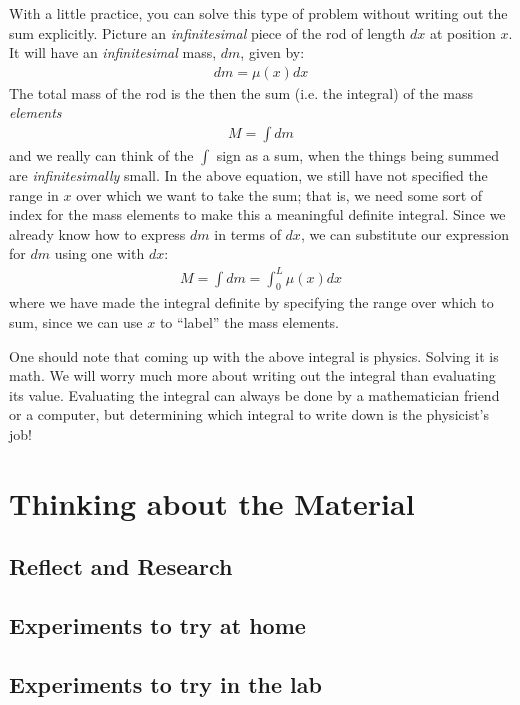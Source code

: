 With a little practice, you can solve this type of problem without writing out the sum explicitly. Picture an \textit{infinitesimal} piece of the rod of length $dx$ at position $x$. It will have an \textit{infinitesimal} mass, $dm$, given by:
\begin{align*}
dm = \mu(x) dx
\end{align*}
The total mass of the rod is the then the sum (i.e. the integral) of the mass \textit{elements}
\begin{align*}
M = \int dm
\end{align*}
and we really can think of the $\int$ sign as a sum, when the things being summed are \textit{infinitesimally} small. In the above equation, we still have not specified the range in $x$ over which we want to take the sum; that is, we need some sort of index for the mass elements to make this a meaningful definite integral. Since we already know how to express $dm$ in terms of $dx$, we can substitute our expression for $dm$ using one with $dx$:
\begin{align*}
M = \int dm = \int_0^L \mu(x) dx
\end{align*}
where we have made the integral definite by specifying the range over which to sum, since we can use $x$ to ``label'' the mass elements.

One should note that coming up with the above integral is physics. Solving it is math. We will worry much more about writing out the integral than evaluating its value. Evaluating the integral can always be done by a mathematician friend or a computer, but determining which integral to write down is the physicist's job!

\section{Thinking about the Material}

\subsection{Reflect and Research}

\subsection{Experiments to try at home}

\subsection{Experiments to try in the lab}

